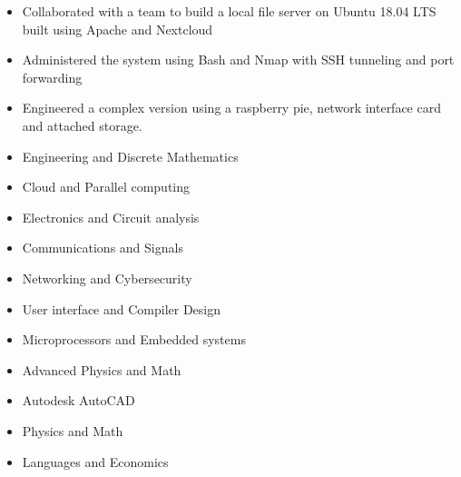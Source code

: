 \documentclass[11pt,a4paper,ragged2e]{altacv}
\begin{document}
\begin{paracol}{2}
\begin{itemize}
\item Collaborated with a team to build a local file server on Ubuntu 18.04 LTS built using Apache and Nextcloud
\item Administered the system using Bash and Nmap with SSH tunneling and port forwarding
\item Engineered a complex version using a raspberry pie, network interface card and attached storage.
\end{itemize}

\switchcolumn
\smallskip

\begin{itemize}
\item Engineering and Discrete Mathematics
\item Cloud and Parallel computing
\item Electronics and Circuit analysis
\item Communications and Signals
\item Networking and Cybersecurity
\item User interface and Compiler Design
\item Microprocessors and Embedded systems
\end{itemize}
\divider


\begin{itemize}
\item Advanced Physics and Math
\item Autodesk AutoCAD
\end{itemize}
\divider
{}

\begin{itemize}
\item Physics and Math
\item Languages and Economics
\end{itemize}


\end{paracol}
\end{document}

